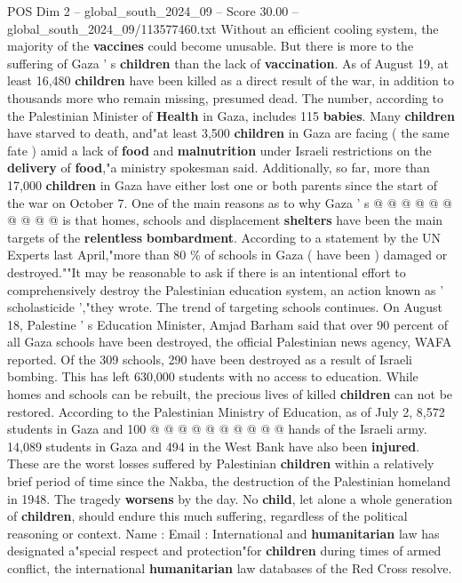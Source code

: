 \begin{textsample}{POS Dim 2 – global\_south\_2024\_09 – Score 30.00 – global\_south\_2024\_09/113577460.txt}
Without an efficient cooling system, the majority of the \textbf{vaccines} could become unusable.
But there is more to the suffering of Gaza ' s \textbf{children} than the lack of \textbf{vaccination}.
As of August 19, at least 16,480 \textbf{children} have been killed as a direct result of the war, in addition to thousands more who remain missing, presumed dead.
The number, according to the Palestinian Minister of \textbf{Health} in Gaza, includes 115 \textbf{babies}.
Many \textbf{children} have starved to death, and"at least 3,500 \textbf{children} in Gaza are facing ( the same fate ) amid a lack of \textbf{food} and \textbf{malnutrition} under Israeli restrictions on the \textbf{delivery} of \textbf{food},"a ministry spokesman said.
Additionally, so far, more than 17,000 \textbf{children} in Gaza have either lost one or both parents since the start of the war on October 7.
One of the main reasons as to why Gaza ' s @ @ @ @ @ @ @ @ @ @ is that homes, schools and displacement \textbf{shelters} have been the main targets of the \textbf{relentless} \textbf{bombardment}.
According to a statement by the UN Experts last April,"more than 80 \% of schools in Gaza ( have been ) damaged or destroyed.""It may be reasonable to ask if there is an intentional effort to comprehensively destroy the Palestinian education system, an action known as ' scholasticide ',"they wrote.
The trend of targeting schools continues.
On August 18, Palestine ' s Education Minister, Amjad Barham said that over 90 percent of all Gaza schools have been destroyed, the official Palestinian news agency, WAFA reported.
Of the 309 schools, 290 have been destroyed as a result of Israeli bombing.
This has left 630,000 students with no access to education.
While homes and schools can be rebuilt, the precious lives of killed \textbf{children} can not be restored.
According to the Palestinian Ministry of Education, as of July 2, 8,572 students in Gaza and 100 @ @ @ @ @ @ @ @ @ @ hands of the Israeli army. 14,089 students in Gaza and 494 in the West Bank have also been \textbf{injured}.
These are the worst losses suffered by Palestinian \textbf{children} within a relatively brief period of time since the Nakba, the destruction of the Palestinian homeland in 1948.
The tragedy \textbf{worsens} by the day.
No \textbf{child}, let alone a whole generation of \textbf{children}, should endure this much suffering, regardless of the political reasoning or context.
Name : Email : International and \textbf{humanitarian} law has designated a"special respect and protection"for \textbf{children} during times of armed conflict, the international \textbf{humanitarian} law databases of the Red Cross resolve.

\end{textsample}
